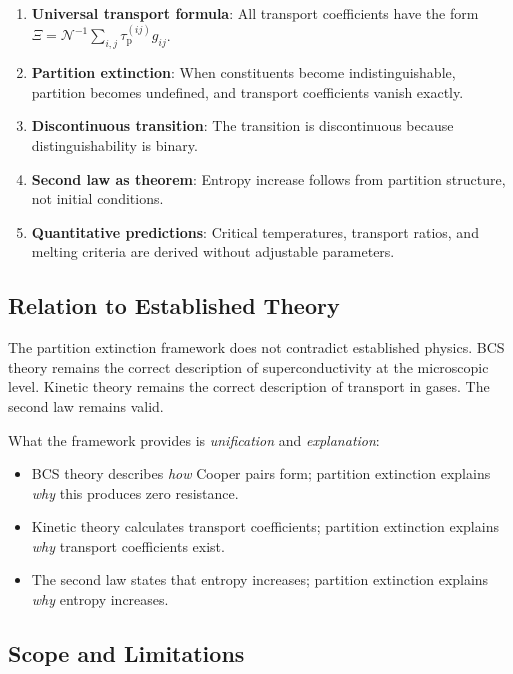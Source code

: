 \documentclass[twocolumn,10pt,aps,prd,superscriptaddress,nofootinbib]{revtex4-2}
\theoremstyle{remark}
\newcommand{\tauP}{\tau_{\mathrm{p}}}
\newcommand{\Gij}{g_{ij}}
\newcommand{\Norm}{\mathcal{N}}
\newcommand{\Transp}{\Xi}
\begin{document}
\begin{enumerate}
\item \textbf{Universal transport formula}: All transport coefficients have the form $\Transp = \Norm^{-1} \sum_{i,j} \tauP^{(ij)} \Gij$.

\item \textbf{Partition extinction}: When constituents become indistinguishable, partition becomes undefined, and transport coefficients vanish exactly.

\item \textbf{Discontinuous transition}: The transition is discontinuous because distinguishability is binary.

\item \textbf{Second law as theorem}: Entropy increase follows from partition structure, not initial conditions.

\item \textbf{Quantitative predictions}: Critical temperatures, transport ratios, and melting criteria are derived without adjustable parameters.
\end{enumerate}

\subsection{Relation to Established Theory}

The partition extinction framework does not contradict established physics. BCS theory remains the correct description of superconductivity at the microscopic level. Kinetic theory remains the correct description of transport in gases. The second law remains valid.

What the framework provides is \emph{unification} and \emph{explanation}:
\begin{itemize}
\item BCS theory describes \emph{how} Cooper pairs form; partition extinction explains \emph{why} this produces zero resistance.
\item Kinetic theory calculates transport coefficients; partition extinction explains \emph{why} transport coefficients exist.
\item The second law states that entropy increases; partition extinction explains \emph{why} entropy increases.
\end{itemize}

\subsection{Scope and Limitations}
\end{document}
